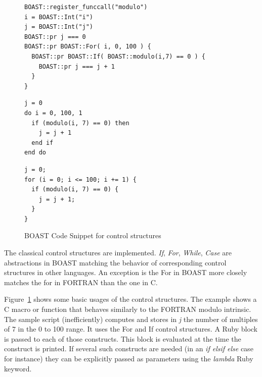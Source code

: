 \documentclass[11pt, a4paper, twoside]{montblanc}
\begin{document}
\begin{figure}
\begin{lstlisting}
BOAST::register_funccall("modulo")
i = BOAST::Int("i")
j = BOAST::Int("j")
BOAST::pr j === 0
BOAST::pr BOAST::For( i, 0, 100 ) {
  BOAST::pr BOAST::If( BOAST::modulo(i,7) == 0 ) {
    BOAST::pr j === j + 1
  }
}
\end{lstlisting}

\begin{minipage}[b]{0.47\linewidth}
\centering
{}

\begin{lstlisting}
j = 0
do i = 0, 100, 1
  if (modulo(i, 7) == 0) then
    j = j + 1
  end if
end do
\end{lstlisting}
\end{minipage}
\hspace{0.04\linewidth}
\begin{minipage}[b]{0.47\linewidth}
\centering
{}

\begin{lstlisting}
j = 0;
for (i = 0; i <= 100; i += 1) {
  if (modulo(i, 7) == 0) {
    j = j + 1;
  }
}
\end{lstlisting}
\end{minipage}
\caption{BOAST Code Snippet for control structures}
\label{fig:BOAST_control}
\end{figure}

The classical control structures are implemented. \emph{If}, \emph{For},
\emph{While}, \emph{Case} are abstractions in BOAST matching the behavior of
corresponding control structures in other languages. An exception is the For in
BOAST more closely matches the for in FORTRAN than the one in C.

Figure~\ref{fig:BOAST_control} shows some basic usages of the control structures.
The example shows a C macro or function that behaves similarly to the FORTRAN modulo
intrinsic. The sample script (inefficiently) computes and stores in \emph{j} the
number of multiples of $7$ in the 0 to 100 range. It uses the For and If control
structures. A Ruby block is passed to each of those constructs. This block is
evaluated at the time the construct is printed. If several such constructs are
needed (in an \emph{if elsif else} case for instance) they can be explicitly
passed as parameters using the \emph{lambda} Ruby keyword.
\end{document}

